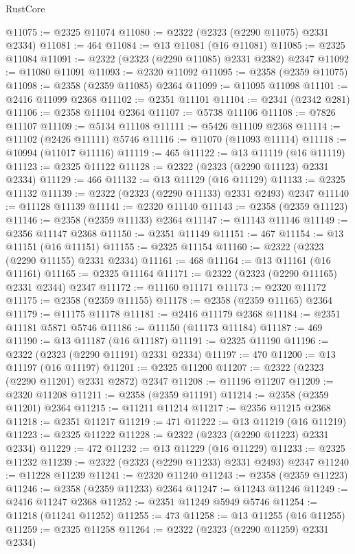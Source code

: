 \begin{lexlean}{RustCore}
\begin{coremodule}
@11075 := @2325 @11074
@11080 := @2322 (@2323 (@2290 @11075) @2331 @2334)
@11081 := 464
@11084 := @13 @11081 (@16 @11081)
@11085 := @2325 @11084
@11091 := @2322 (@2323 (@2290 @11085) @2331 @2382) @2347
@11092 := @11080 @11091
@11093 := @2320 @11092
@11095 := @2358 (@2359 @11075)
@11098 := @2358 (@2359 @11085) @2364
@11099 := @11095 @11098
@11101 := @2416 @11099 @2368
@11102 := @2351 @11101
@11104 := @2341 (@2342 @281)
@11106 := @2358 @11104 @2364
@11107 := @5738 @11106
@11108 := @7826 @11107
@11109 := @5134 @11108
@11111 := @5426 @11109 @2368
@11114 := @11102 (@2426 @11111) @5746
@11116 := @11070 (@11093 @11114)
@11118 := @10994 (@11017 @11116)
@11119 := 465
@11122 := @13 @11119 (@16 @11119)
@11123 := @2325 @11122
@11128 := @2322 (@2323 (@2290 @11123) @2331 @2334)
@11129 := 466
@11132 := @13 @11129 (@16 @11129)
@11133 := @2325 @11132
@11139 := @2322 (@2323 (@2290 @11133) @2331 @2493) @2347
@11140 := @11128 @11139
@11141 := @2320 @11140
@11143 := @2358 (@2359 @11123)
@11146 := @2358 (@2359 @11133) @2364
@11147 := @11143 @11146
@11149 := @2356 @11147 @2368
@11150 := @2351 @11149
@11151 := 467
@11154 := @13 @11151 (@16 @11151)
@11155 := @2325 @11154
@11160 := @2322 (@2323 (@2290 @11155) @2331 @2334)
@11161 := 468
@11164 := @13 @11161 (@16 @11161)
@11165 := @2325 @11164
@11171 := @2322 (@2323 (@2290 @11165) @2331 @2344) @2347
@11172 := @11160 @11171
@11173 := @2320 @11172
@11175 := @2358 (@2359 @11155)
@11178 := @2358 (@2359 @11165) @2364
@11179 := @11175 @11178
@11181 := @2416 @11179 @2368
@11184 := @2351 @11181 @5871 @5746
@11186 := @11150 (@11173 @11184)
@11187 := 469
@11190 := @13 @11187 (@16 @11187)
@11191 := @2325 @11190
@11196 := @2322 (@2323 (@2290 @11191) @2331 @2334)
@11197 := 470
@11200 := @13 @11197 (@16 @11197)
@11201 := @2325 @11200
@11207 := @2322 (@2323 (@2290 @11201) @2331 @2872) @2347
@11208 := @11196 @11207
@11209 := @2320 @11208
@11211 := @2358 (@2359 @11191)
@11214 := @2358 (@2359 @11201) @2364
@11215 := @11211 @11214
@11217 := @2356 @11215 @2368
@11218 := @2351 @11217
@11219 := 471
@11222 := @13 @11219 (@16 @11219)
@11223 := @2325 @11222
@11228 := @2322 (@2323 (@2290 @11223) @2331 @2334)
@11229 := 472
@11232 := @13 @11229 (@16 @11229)
@11233 := @2325 @11232
@11239 := @2322 (@2323 (@2290 @11233) @2331 @2493) @2347
@11240 := @11228 @11239
@11241 := @2320 @11240
@11243 := @2358 (@2359 @11223)
@11246 := @2358 (@2359 @11233) @2364
@11247 := @11243 @11246
@11249 := @2416 @11247 @2368
@11252 := @2351 @11249 @5949 @5746
@11254 := @11218 (@11241 @11252)
@11255 := 473
@11258 := @13 @11255 (@16 @11255)
@11259 := @2325 @11258
@11264 := @2322 (@2323 (@2290 @11259) @2331 @2334)

\end{coremodule}
\end{lexlean}
